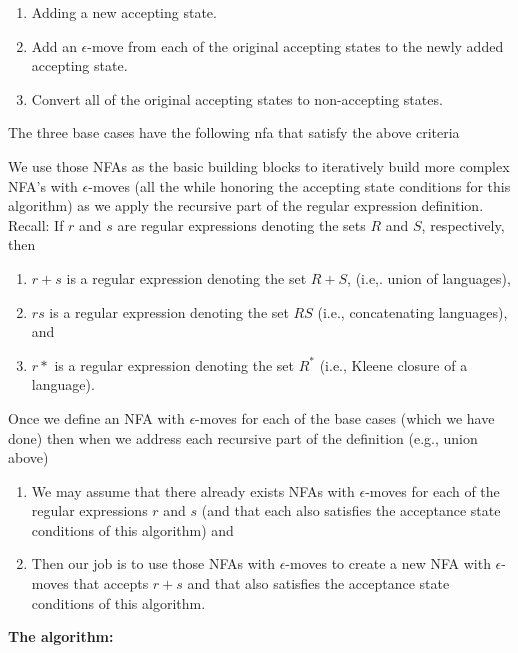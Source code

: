 \documentclass{report}
\begin{document}
\begin{itemize}
        \begin{enumerate}
            \item Adding a new accepting state.
            \item Add an $\epsilon$-move from each of the original accepting states to the newly added accepting state.
            \item Convert all of the original accepting states to non-accepting states.
        \end{enumerate}
        \bigbreak \noindent 
        The three base cases have the following nfa that satisfy the above criteria
        \bigbreak \noindent 
\begin{figure}[ht]
    \centering
    \label{fig:crit2}
\end{figure}
\bigbreak \noindent 
We use those NFAs as the basic building blocks to iteratively build more complex NFA's with $\epsilon$-moves (all the while honoring the accepting state conditions for this algorithm) as we apply the recursive part of the regular expression definition. Recall:
\bigbreak \noindent 
If $r$ and $s$ are regular expressions denoting the sets $R$ and $S$, respectively, then
\begin{enumerate}
    \item $r+s$ is a regular expression denoting the set $R + S$, (i.e,. union of languages),
    \item $rs$ is a regular expression denoting the set $RS$ (i.e., concatenating languages), and
\item $r*$ is a regular expression denoting the set $R^{*}$ (i.e., Kleene closure of a language).
\end{enumerate}
\bigbreak \noindent 
Once we define an NFA with $\epsilon$-moves for each of the base cases (which we have done) then when we address each recursive part of the definition (e.g., union above)
\begin{enumerate}
    \item We may assume that there already exists NFAs with $\epsilon$-moves for each of the regular expressions $r$ and $s$ (and that each also satisfies the acceptance state conditions of this algorithm) and 
    \item Then our job is to use those NFAs with $\epsilon$-moves to create a new NFA with $\epsilon$-moves that accepts $r+s$ and that also satisfies the acceptance state conditions of this algorithm.
\end{enumerate}
\bigbreak \noindent 
\textbf{The algorithm:}
\begin{itemize}

\end{itemize}
\end{itemize}
\end{document}
